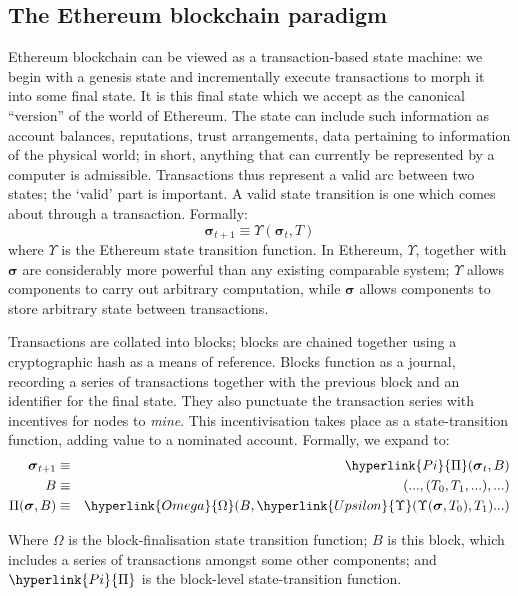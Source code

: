 \documentclass{isprs} %
\begin{document}
\subsection{The Ethereum blockchain paradigm}\label{sec:The Ethereum blockchain paradigm}

Ethereum blockchain can be viewed as a transaction-based state machine: we begin with a genesis state and incrementally execute transactions to morph it into some final state. It is this final state which we accept as the canonical “version” of the world of Ethereum. The state can include such information as account balances, reputations, trust arrangements, data pertaining to information of the physical world; in short, anything that can currently be represented by a computer is admissible. Transactions thus represent a valid arc between two states; the ‘valid’ part is important. A valid state transition is one which comes about through a transaction. Formally:
\begin{equation}
\boldsymbol{\sigma}_{t+1} \equiv \Upsilon(\boldsymbol{\sigma}_{t}, T)
\end{equation}
where $\Upsilon$ is the Ethereum state transition function. In Ethereum, $\Upsilon$, together with $\boldsymbol{\sigma}$ are considerably more powerful than any existing comparable system; $\Upsilon$ allows components to carry out arbitrary computation, while $\boldsymbol{\sigma}$ allows components to store arbitrary state between transactions.

Transactions are collated into blocks; blocks are chained together using a cryptographic hash as a means of reference. Blocks function as a journal, recording a series of transactions together with the previous block and an identifier for the final state. They also punctuate the transaction series with incentives for nodes to \textit{mine}. This incentivisation takes place as a state-transition function, adding value to a nominated account. Formally, we expand to:
\begin{eqnarray}
\boldsymbol{\sigma}_{t+1} & \equiv & \hyperlink{Pi}{\Pi}(\boldsymbol{\sigma}_{t}, B) \\
B & \equiv & (..., (T_0, T_1, ...), ...) \\
\Pi(\boldsymbol{\sigma}, B) & \equiv & \hyperlink{Omega}{\Omega}(B, \hyperlink{Upsilon}{\Upsilon}(\Upsilon(\boldsymbol{\sigma}, T_0), T_1) ...)
\end{eqnarray}

Where \hyperlink{Omega}{$\Omega$} is the block-finalisation state transition function; \hyperlink{block}{$B$} is this block, which includes a series of transactions amongst some other components; and $\hyperlink{Pi}{\Pi}$ is the block-level state-transition function.
\end{document}
